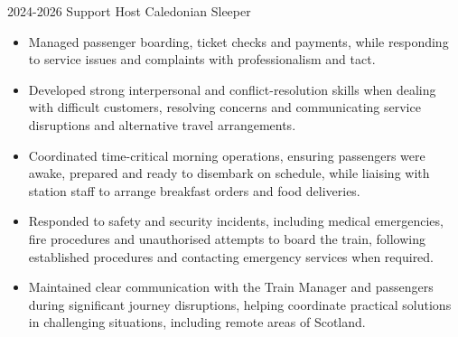 \documentclass[9pt]{developercv} %
\begin{document}
	\begin{entrylist}

		\entry
			{2024-2026}
			{Support Host}
			{Caledonian Sleeper}
			{
				\begin{itemize}
					\item[$\bullet$\hspace*{0.5cm}] Managed passenger boarding, ticket checks and payments, while responding to service issues and complaints with professionalism and tact.
					\item[$\bullet$\hspace*{0.5cm}] Developed strong interpersonal and conflict-resolution skills when dealing with difficult customers, resolving concerns and communicating service disruptions and alternative travel arrangements.
					\item[$\bullet$\hspace*{0.5cm}] Coordinated time-critical morning operations, ensuring passengers were awake, prepared and ready to disembark on schedule, while liaising with station staff to arrange breakfast orders and food deliveries.
					\item[$\bullet$\hspace*{0.5cm}] Responded to safety and security incidents, including medical emergencies, fire procedures and unauthorised attempts to board the train, following established procedures and contacting emergency services when required.
					\item[$\bullet$\hspace*{0.5cm}] Maintained clear communication with the Train Manager and passengers during significant journey disruptions, helping coordinate practical solutions in challenging situations, including remote areas of Scotland.
				\end{itemize}
			}


\end{entrylist}
\end{document}
